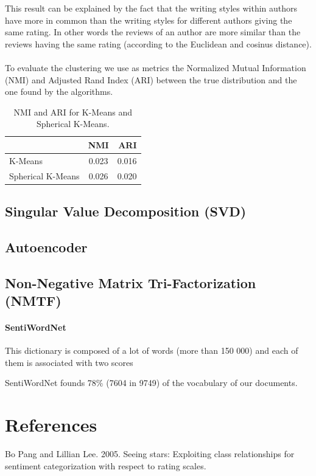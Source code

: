 \documentclass{article}
\begin{document}
This result can be explained by the fact that the writing styles within authors have more in common than the writing styles for different authors giving the same rating. In other words the reviews of an author are more similar than the reviews having the same rating (according to the Euclidean and cosinus distance).
\\\\
To evaluate the clustering we use as metrics the Normalized Mutual Information (NMI) and Adjusted Rand Index (ARI) between the true distribution and the one found by the algorithms.

\begin{table}[H] \label{tab:kmeans_nmi_ari}
\centering
\begin{tabular}{|l|c|r|}
  \hline
  & NMI & ARI \\
  \hline
  K-Means & 0.023 & 0.016 \\
  Spherical K-Means & 0.026 & 0.020 \\
  \hline
\end{tabular}
\caption{NMI and ARI for K-Means and Spherical K-Means.}
\end{table}


\subsection{Singular Value Decomposition (SVD)}



\subsection{Autoencoder}



\subsection{Non-Negative Matrix Tri-Factorization (NMTF)}

\paragraph{SentiWordNet}
This dictionary is composed of a lot of words (more than 150 000) and each of them is associated with two scores

SentiWordNet founds 78\% (7604 in 9749) of the vocabulary of our documents.



\section*{References}
Bo Pang and Lillian Lee. 2005. Seeing stars: Exploiting class relationships for sentiment categorization with respect to rating scales.
\end{document}
